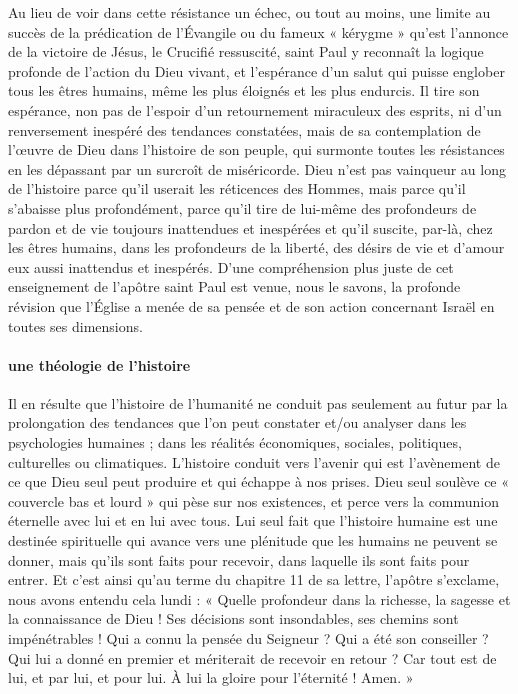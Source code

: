 Au lieu de voir dans cette résistance un échec, ou tout au moins, une limite au succès de la prédication de l’Évangile ou du fameux « kérygme » qu’est l’annonce de la victoire de Jésus, le Crucifié ressuscité, saint Paul y reconnaît la logique profonde de l’action du Dieu vivant, et l’espérance d’un salut qui puisse englober tous les êtres humains, même les plus éloignés et les plus endurcis. Il tire son espérance, non pas de l’espoir d’un retournement miraculeux des esprits, ni d’un renversement inespéré des tendances constatées, mais de sa contemplation de l’œuvre de Dieu dans l’histoire de son peuple, qui surmonte toutes les résistances en les dépassant par un surcroît de miséricorde. Dieu n’est pas vainqueur au long de l’histoire parce qu’il userait les réticences des Hommes, mais parce qu’il s’abaisse plus profondément, parce qu’il tire de lui-même des profondeurs de pardon et de vie toujours inattendues et inespérées et qu’il suscite, par-là, chez les êtres humains, dans les profondeurs de la liberté, des désirs de vie et d’amour eux aussi inattendus et inespérés. D’une compréhension plus juste de cet enseignement de l’apôtre saint Paul est venue, nous le savons, la profonde révision que l’Église a menée de sa pensée et de son action concernant Israël en toutes ses dimensions.

\paragraph{une théologie de l'histoire}
Il en résulte que l’histoire de l’humanité ne conduit pas seulement au futur par la prolongation des tendances que l’on peut constater et/ou analyser dans les psychologies humaines ; dans les réalités économiques, sociales, politiques, culturelles ou climatiques. L’histoire conduit vers l’avenir qui est l’avènement de ce que Dieu seul peut produire et qui échappe à nos prises. Dieu seul soulève ce
« couvercle bas et lourd » qui pèse sur nos existences, et perce vers la communion éternelle avec lui et en lui avec tous. Lui seul fait que l’histoire humaine est une destinée spirituelle qui avance vers une plénitude que les humains ne peuvent se donner, mais qu’ils sont faits pour recevoir, dans laquelle ils sont faits pour entrer.
Et c’est ainsi qu’au terme du chapitre 11 de sa lettre, l’apôtre s’exclame, nous avons entendu cela lundi : « Quelle profondeur dans la richesse, la sagesse et la connaissance de Dieu ! Ses décisions sont insondables, ses chemins sont impénétrables ! Qui a connu la pensée du Seigneur ? Qui a été son conseiller ? Qui lui a donné en premier et mériterait de recevoir en retour ? Car tout est de lui, et par lui, et pour lui. À lui la gloire pour l’éternité ! Amen. »


